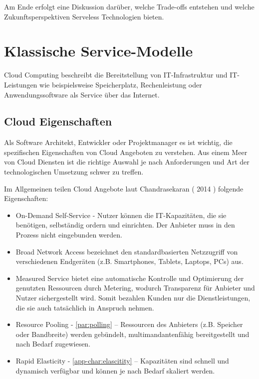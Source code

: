 \documentclass[
12pt,
english,
ngerman,
headsepline,
twoside,
openright,
numbers=noenddot,version=first
]{scrreprt}
\begin{document}
Am Ende erfolgt eine Diskussion darüber, welche Trade-offs entstehen und welche Zukunftsperspektiven Serveless Technologien bieten.


\chapter{Klassische Service-Modelle}
\label{chap:service-models}
\label{chap:principles}
Cloud Computing beschreibt die Bereitstellung von IT-Infrastruktur und IT-Leistungen wie beispielsweise Speicherplatz, Rechenleistung oder Anwendungssoftware als Service über das Internet.\cite{cloudEssentials}

\section{Cloud Eigenschaften}
\label{sec:cloud-char}
Als Software Architekt, Entwickler oder Projektmanager es ist wichtig, die spezifischen Eigenschaften von Cloud Angeboten zu verstehen. Aus einem Meer von Cloud Diensten ist die richtige Auswahl je nach Anforderungen und Art der technologischen Umsetzung schwer zu treffen. 


Im Allgemeinen teilen Cloud Angebote laut Chandrasekaran ( 2014 ) folgende Eigenschaften:
\begin{itemize}
	\item On-Demand Self-Service - Nutzer können die IT-Kapazitäten, die sie benötigen, selbständig ordern und einrichten. Der Anbieter muss in den Prozess nicht eingebunden werden.
	\item Broad Network Access bezeichnet den standardbasierten Netzzugriff von verschiedenen Endgeräten (z.B. Smartphones, Tablets, Laptops, PCs) aus.
	\item Measured Service bietet eine automatische Kontrolle und Optimierung der genutzten Ressourcen durch Metering, wodurch Transparenz für Anbieter und Nutzer sichergestellt wird. Somit bezahlen Kunden nur die Dienstleistungen, die sie auch tatsächlich in Anspruch nehmen.
	\item Resource Pooling - \ref{par:polling} – Ressourcen des Anbieters (z.B. Speicher oder Bandbreite) werden gebündelt, multimandantenfähig bereitgestellt und nach Bedarf zugewiesen.
	\item Rapid Elasticity - \ref{app-char:elascitity} – Kapazitäten sind schnell und dynamisch verfügbar und können je nach Bedarf skaliert werden.\cite{cloudEssentials}
\end{itemize}
\end{document}

